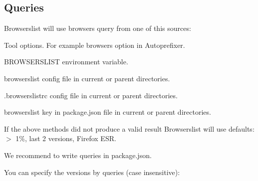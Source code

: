 \subsection*{Queries}

Browserslist will use browsers query from one of this sources\+:


\begin{DoxyEnumerate}
\item Tool options. For example {\ttfamily browsers} option in Autoprefixer.
\item {\ttfamily B\+R\+O\+W\+S\+E\+R\+S\+L\+I\+ST} environment variable.
\item {\ttfamily browserslist} config file in current or parent directories.
\end{DoxyEnumerate}
\begin{DoxyEnumerate}
\item {\ttfamily .browserslistrc} config file in current or parent directories.
\item {\ttfamily browserslist} key in {\ttfamily package.\+json} file in current or parent directories.
\item If the above methods did not produce a valid result Browserslist will use defaults\+: {\ttfamily $>$ 1\%, last 2 versions, Firefox E\+SR}.
\end{DoxyEnumerate}

We recommend to write queries in {\ttfamily package.\+json}.

You can specify the versions by queries (case insensitive)\+:


